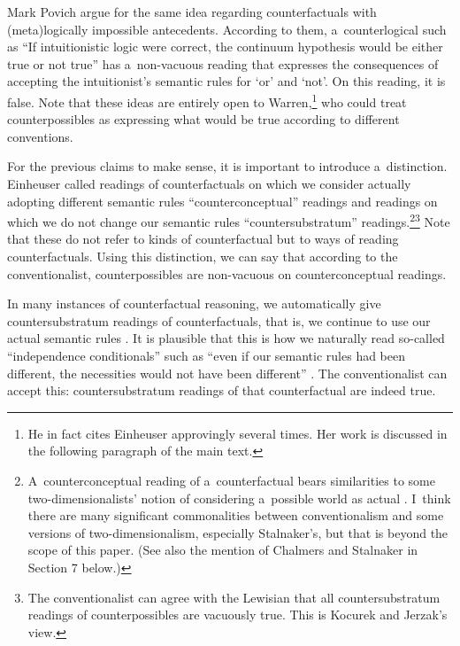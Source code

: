 \begin{artengenv}{Mark Povich}
\parencite*[][]{kocurek_counterlogicals_2021} %
 argue for the same idea regarding counterfactuals with (meta)logically impossible antecedents. According to them, a~counterlogical such as ``If intuitionistic logic were correct, the continuum hypothesis would be either true or not true'' has a~non-vacuous reading that expresses the consequences of accepting the intuitionist's semantic rules for ‘or' and ‘not'. On this reading, it is false. Note that these ideas are entirely open to Warren,\footnote{He in fact cites Einheuser approvingly several times. Her work is discussed in the following paragraph of the main text.} who could treat counterpossibles as expressing what would be true according to different conventions.

For the previous claims to make sense, it is important to introduce a~distinction. Einheuser
\parencite*[][]{einheuser_toward_2011} %
 called readings of counterfactuals on which we consider actually adopting different semantic rules ``counterconceptual'' readings and readings on which we do not change our semantic rules ``countersubstratum'' readings.\footnote{A~counterconceptual reading of a~counterfactual bears similarities to some two-dimensionalists' notion of considering a~possible world as actual 
\parencite[][]{stalnaker_considering_2001}. %
 I~think there are many significant commonalities between conventionalism and some versions of two-dimensionalism, especially Stalnaker's, but that is beyond the scope of this paper. (See also the mention of Chalmers and Stalnaker in Section 7 below.)}\footnote{The conventionalist can agree with the Lewisian that all countersubstratum readings of counterpossibles are vacuously true. This is Kocurek and Jerzak's view.} Note that these do not refer to kinds of counterfactual but to ways of reading counterfactuals. Using this distinction, we can say that according to the conventionalist, counterpossibles are non-vacuous on counterconceptual readings.

In many instances of counterfactual reasoning, we automatically give countersubstratum readings of counterfactuals, that is, we continue to use our actual semantic rules
\parencites[][]{kripke_naming_1980}[][]{wright_defence_1985}[but see][]{kocurek_against_2020}. %
 It is plausible that this is how we naturally read so-called ``independence conditionals'' such as ``even if our semantic rules had been different, the necessities would not have been different'' 
\parencites[][]{thomasson_modal_2007}[see also][]{sidelle_conventionalism_2009}[][]{thomasson_norms_2020}. %
 The conventionalist can accept this: countersubstratum readings of that counterfactual are indeed true.


\end{artengenv}
